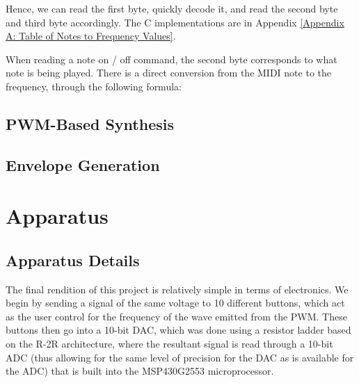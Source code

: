 \documentclass[10pt]{article}
\begin{document}
Hence, we can read the first byte, quickly decode it, and read the second byte and third byte accordingly. The C implementations are in Appendix \ref{Appendix A: Table of Notes to Frequency Values}. 

When reading a note on / off command, the second byte corresponds to what note is being played. There is a direct conversion from the MIDI note to the frequency, through the following formula:




\subsection{PWM-Based Synthesis}\label{PWM-Based Synthesis Theory}

\subsection{Envelope Generation}\label{Envelope Generation Theory}


\section{Apparatus}\label{Apparatus}


\subsection{Apparatus Details}\label{Apparatus Details}

The final rendition of this project is relatively simple in terms of electronics. We begin by sending a signal of the same voltage to 10 different buttons, which act as the user control for the frequency of the wave emitted from the PWM. These buttons then go into a 10-bit DAC, which was done using a resistor ladder based on the R-2R architecture, where the resultant signal is read through a 10-bit ADC (thus allowing for the same level of precision for the DAC as is available for the ADC) that is built into the MSP430G2553 microprocessor. %

\end{document}
